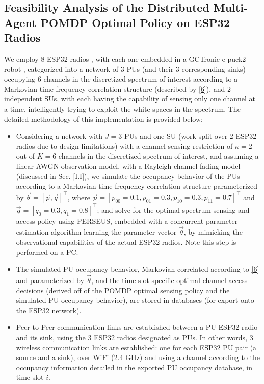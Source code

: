 \documentclass[12pt, draftcls, onecolumn]{IEEEtran}
\begin{document}
\subsection{Feasibility Analysis of the Distributed Multi-Agent POMDP Optimal Policy on ESP32 Radios}\label{D}
We employ $8$ ESP32 radios \cite{Espressif:ESP32}, with each one embedded in a GCTronic e-puck2 robot \cite{GCTronic:epuck2}, categorized into a network of $3$ PUs (and their $3$ corresponding sinks) occupying $6$ channels in the discretized spectrum of interest according to a Markovian time-frequency correlation structure (described by \eqref{6}), and $2$ independent SUs, with each having the capability of sensing only one channel at a time, intelligently trying to exploit the white-spaces in the spectrum. The detailed methodology of this implementation is provided below:
\begin{itemize}
    \item Considering a network with $J{=}3$ PUs and one SU (work split over $2$ ESP32 radios due to design limitations) with a channel sensing restriction of $\kappa{=}2$ out of $K{=}6$ channels in the discretized spectrum of interest, and assuming a linear AWGN observation model, with a Rayleigh channel fading model (discussed in Sec. \ref{I.I}), we simulate the occupancy behavior of the PUs according to a Markovian time-frequency correlation structure parameterized by $\vec{\theta}{=}[\vec{p},\vec{q}]^{\intercal}$, where $\vec{p}{=}[p_{00}{=}0.1,p_{01}{=}0.3,p_{10}{=}0.3,p_{11}{=}0.7]^{\intercal}$
     and $\vec{q}{=}[q_{0}{=}0.3,q_{1}{=}0.8]^{\intercal}$; and solve for the optimal spectrum sensing and access policy using PERSEUS, embedded with a concurrent parameter estimation algorithm learning the parameter vector $\vec{\theta}$, by mimicking the observational capabilities of the actual ESP32 radios. Note this step is performed on a PC.
    \item The simulated PU occupancy behavior, Markovian correlated according to \eqref{6} and parameterized by $\vec{\theta}$, and the time-slot specific optimal channel access decisions (derived off of the POMDP optimal sensing policy and the simulated PU occupancy behavior), are stored in databases (for export onto the ESP32 network).
    \item Peer-to-Peer communication links are established between a PU ESP32 radio and its sink, using the $3$ ESP32 radios designated as PUs. In other words, $3$ wireless communication links are established: one for each ESP32 PU pair (a source and a sink), over WiFi ($2.4$ GHz) and using a channel according to the occupancy information detailed in the exported PU occupancy database, in time-slot $i$.

\end{itemize}
\end{document}
